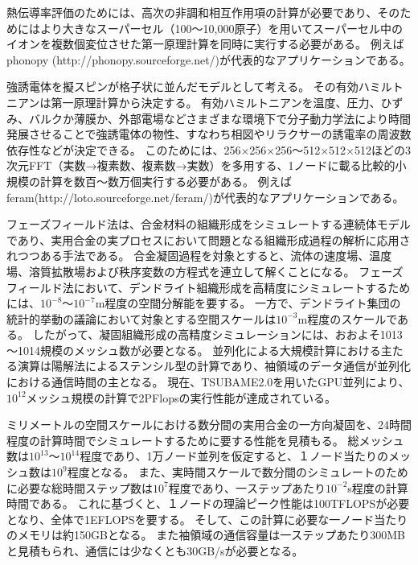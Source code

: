 熱伝導率評価のためには、高次の非調和相互作用項の計算が必要であり、そのためにはより大きなスーパーセル（100～10,000原子）を用いてスーパーセル中のイオンを複数個変位させた第一原理計算を同時に実行する必要がある。
例えばphonopy (http://phonopy.sourceforge.net/)が代表的なアプリケーションである。

強誘電体を擬スピンが格子状に並んだモデルとして考える。
その有効ハミルトニアンは第一原理計算から決定する。
有効ハミルトニアンを温度、圧力、ひずみ、バルクか薄膜か、外部電場などさまざまな環境下で分子動力学法により時間発展させることで強誘電体の物性、すなわち相図やリラクサーの誘電率の周波数依存性などが決定できる。
このためには、256×256×256～512×512×512ほどの3次元FFT（実数→複素数、複素数→実数）を多用する、1ノードに載る比較的小規模の計算を数百～数万個実行する必要がある。
例えばferam(http://loto.sourceforge.net/feram/)が代表的なアプリケーションである。


\label{sec:4-2_要求性能_フェーズフィールド}
フェーズフィールド法は、合金材料の組織形成をシミュレートする連続体モデルであり、実用合金の実プロセスにおいて問題となる組織形成過程の解析に応用されつつある手法である。
合金凝固過程を対象とすると、流体の速度場、温度場、溶質拡散場および秩序変数の方程式を連立して解くことになる。
フェーズフィールド法において、デンドライト組織形成を高精度にシミュレートするためには、$10^{-8}$～$10^{-7}$m程度の空間分解能を要する。
一方で、デンドライト集団の統計的挙動の議論において対象とする空間スケールは$10^{-3}$m程度のスケールである。
したがって、凝固組織形成の高精度シミュレーションには、おおよそ1013～1014規模のメッシュ数が必要となる。
並列化による大規模計算における主たる演算は陽解法によるステンシル型の計算であり、袖領域のデータ通信が並列化における通信時間の主となる。
現在、TSUBAME2.0を用いたGPU並列により、$10^{12}$メッシュ規模の計算で2PFlopsの実行性能が達成されている。

ミリメートルの空間スケールにおける数分間の実用合金の一方向凝固を、24時間程度の計算時間でシミュレートするために要する性能を見積もる。
総メッシュ数は$10^{13}$～$10^{14}$程度であり、1万ノード並列を仮定すると、１ノード当たりのメッシュ数は$10^9$程度となる。
また、実時間スケールで数分間のシミュレートのために必要な総時間ステップ数は$10^7$程度であり、一ステップあたり$10^{-2}$s程度の計算時間である。
これに基づくと、１ノードの理論ピーク性能は100TFLOPSが必要となり、全体で1EFLOPSを要する。
そして、この計算に必要な一ノード当たりのメモリは約150GBとなる。
また袖領域の通信容量は一ステップあたり300MBと見積もられ、通信には少なくとも30GB/sが必要となる。


